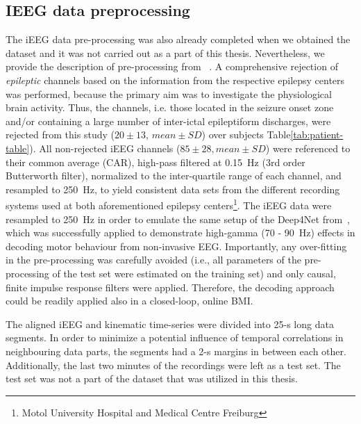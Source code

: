 \subsection{IEEG data preprocessing}\label{subsec:ieeg-data-preprocessing}
The iEEG data pre-processing was also already completed when we obtained the dataset and it was not carried out as a part of this thesis.
Nevertheless, we provide the description of pre-processing from ~\cite{Hammer-2021}.
A comprehensive rejection of \textit{epileptic} channels based on the information from the respective epilepsy centers was performed, because the primary aim was to investigate the physiological brain activity.
Thus, the channels, i.e. those located in the seizure onset zone and/or containing a large number of inter-ictal epileptiform discharges, were rejected from this study ($20 \pm 13$, $mean \pm SD$) over subjects Table\ref{tab:patient-table}).
All non-rejected iEEG channels ($85 \pm 28, mean \pm SD$) were referenced to their common average (CAR), high-pass filtered at 0.15~Hz (3rd order Butterworth filter), normalized to the inter-quartile range of each channel, and resampled to 250~Hz, to yield consistent data sets from the different recording systems used at both aforementioned epilepsy centers\footnote{Motol University Hospital and Medical Centre Freiburg}.
The iEEG data were resampled to 250~Hz in order to emulate the same setup of the Deep4Net from~\cite{schirrmeister-deep-2017}, which was successfully applied to demonstrate high-gamma (70 - 90~Hz) effects in decoding motor behaviour from non-invasive EEG. Importantly, any over-fitting in the pre-processing was carefully avoided (i.e., all parameters of the pre-processing of the test set were estimated on the training set) and only causal, finite impulse response filters were applied.
Therefore, the decoding approach could be readily applied also in a closed-loop, online BMI.

The aligned iEEG and kinematic time-series were divided into 25-s long data segments.
In order to minimize a potential influence of temporal correlations in neighbouring data parts, the segments had a 2-s margins in between each other.
Additionally, the last two minutes of the recordings were left as a test set.
The test set was not a part of the dataset that was utilized in this thesis.


